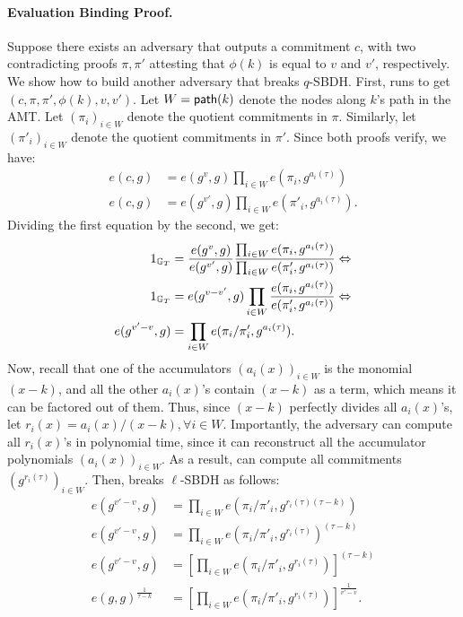 \paragraph{Evaluation Binding Proof.}
Suppose there exists an adversary \Adv that outputs a commitment $c$, with two contradicting proofs $\pi, \pi'$ attesting that $\phi(k)$ is equal to $v$ and $v'$, respectively.
We show how to build another adversary \AdvB that breaks $q$-SBDH.
First, \AdvB runs \Adv to get $(c, \pi, \pi', \phi(k), v, v')$.
Let $W=\mathsf{path}(k)$ denote the nodes along $k$'s path in the AMT.
Let $(\pi_i)_{i\in W}$ denote the quotient commitments in $\pi$.
Similarly, let $(\pi'_i)_{i\in W}$ denote the quotient commitments in $\pi'$.
Since both proofs verify, we have:
\begin{align*}
e(c, g) &= e(g^{v}, g) \prod_{i\in W} {e(\pi_i, g^{a_i(\tau)})}\\
e(c, g) &= e(g^{v'}, g) \prod_{i \in W} {e(\pi'_i, g^{a_i(\tau)})}.
\end{align*}
Dividing the first equation by the second, we get:
\begin{align*}
1_{\mathbb{G}_T} &= \frac{e(g^{v}, g)}{e(g^{v'}, g)} \frac{\prod_{i \in W} {e(\pi_i, g^{a_i(\tau)})}} {\prod_{i \in W} {e(\pi'_i, g^{a_i(\tau)})}}\Leftrightarrow\\
1_{\mathbb{G}_T} &= {e(g^{v-v'}, g)} \prod_{i \in W} \frac{e(\pi_i, g^{a_i(\tau)})}{e(\pi'_i, g^{a_i(\tau)})} \Leftrightarrow\\
e(g^{v'-v}, g) &= \prod_{i \in W} e(\pi_i / \pi'_i, g^{a_i(\tau)}).
\end{align*}
Now, recall that one of the accumulators $(a_i(x))_{i\in W}$ is the monomial $(x - k)$, and all the other $a_i(x)$'s contain $(x-k)$ as a term, which means it can be factored out of them.
Thus, since $(x-k)$ perfectly divides all $a_i(x)$'s, let $r_i(x) = a_i(x) / (x-k), \forall i\in W$.
Importantly, the adversary \AdvB can compute all $r_i(x)$'s in polynomial time, since it can reconstruct all the accumulator polynomials $(a_i(x))_{i\in W}$.
As a result, \AdvB can compute all commitments $(g^{r_i(\tau)})_{i \in W}$.
Then, \AdvB breaks $\ell$-SBDH as follows:
\begin{align*}
e(g^{v'-v}, g) &= \prod_{i\in W} {e(\pi_i / \pi'_i, g^{r_i(\tau)(\tau-k)})}\\
e(g^{v'-v}, g) &= \prod_{i\in W} {e(\pi_i / \pi'_i, g^{r_i(\tau)})^{(\tau-k)}}\\
e(g^{v'-v}, g) &= \left[\prod_{i\in W} {e(\pi_i / \pi'_i, g^{r_i(\tau)})}\right]^{(\tau-k)}\\
e(g, g)^{\frac{1}{\tau-k}} &= \left[\prod_{i\in W} {e(\pi_i / \pi'_i, g^{r_i(\tau)})}\right]^{\frac{1}{v'-v}}.
\end{align*}
